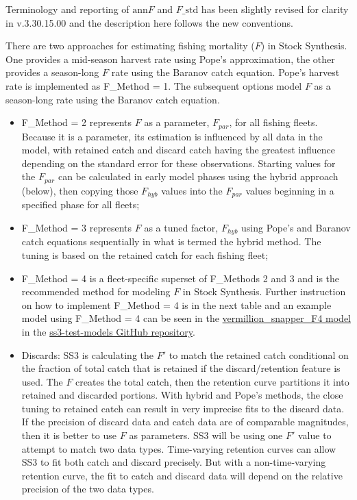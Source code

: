 Terminology and reporting of $\text{ann}F$ and $F\text{\_std}$ has been slightly revised for clarity in v.3.30.15.00 and the description here follows the new conventions.

There are two approaches for estimating fishing mortality ($F$) in Stock Synthesis. One provides a mid-season harvest rate using Pope's approximation, the other provides a season-long $F$ rate using the Baranov catch equation. Pope's harvest rate is implemented as F\_Method = 1. The subsequent options model $F$ as a season-long rate using the Baranov catch equation.

\begin{itemize}
	\item F\_Method = 2 represents $F$ as a parameter, $F_{par}$, for all fishing fleets. Because it is a parameter, its estimation is influenced by all data in the model, with retained catch and discard catch having the greatest influence depending on the standard error for these observations. Starting values for the $F_{par}$ can be calculated in early model phases using the hybrid approach (below), then copying those $F_{hyb}$ values into the $F_{par}$ values beginning in a specified phase for all fleets;
	\item F\_Method = 3 represents $F$ as a tuned factor, $F_{hyb}$ using Pope's and Baranov catch equations sequentially in what is termed the hybrid method. The tuning is based on the retained catch for each fishing fleet;
	\item F\_Method = 4 is a fleet-specific superset of F\_Methods 2 and 3 and is the recommended method for modeling $F$ in Stock Synthesis. Further instruction on how to implement F\_Method = 4 is in the next table and an example model using F\_Method = 4 can be seen in the \href{https://github.com/nmfs-ost/ss3-test-models/blob/main/models/vermillion_snapper_F4/vermilion.ctl#L149-L162}{vermillion\_snapper\_F4 model} in the \href{https://github.com/nmfs-ost/ss3-test-models/tree/main}{ss3-test-models GitHub repository}.
	\item Discards: SS3 is calculating the $F'$ to match the retained catch conditional on the fraction of total catch that is retained if the discard/retention feature is used. The $F$ creates the total catch, then the retention curve partitions it into retained and discarded portions. With hybrid and Pope's methods, the close tuning to retained catch can result in very imprecise fits to the discard data. If the precision of discard data and catch data are of comparable magnitudes, then it is better to use $F$ as parameters. SS3 will be using one $F'$ value to attempt to match two data types. Time-varying retention curves can allow SS3 to fit both catch and discard precisely. But with a non-time-varying retention curve, the fit to catch and discard data will depend on the relative precision of the two data types.
\end{itemize}

